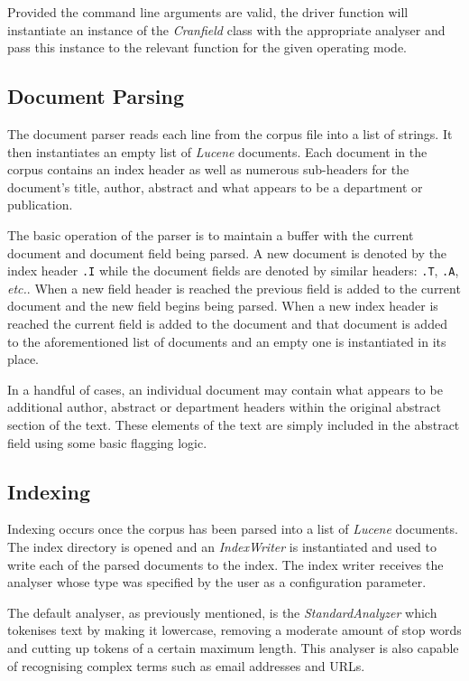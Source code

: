 \documentclass[journal]{IEEEtran}
\begin{document}
Provided the command line arguments are valid, the driver function will instantiate an instance of the \textit{Cranfield} class with the appropriate analyser and pass this instance to the relevant function for the given operating mode.

\subsection{Document Parsing}

The document parser reads each line from the corpus file into a list of strings. It then instantiates an empty list of \textit{Lucene} documents. Each document in the corpus contains an index header as well as numerous sub-headers for the document's title, author, abstract and what appears to be a department or publication.

The basic operation of the parser is to maintain a buffer with the current document and document field being parsed. A new document is denoted by the index header \texttt{.I} while the document fields are denoted by similar headers: \texttt{.T}, \texttt{.A}, \textit{etc.}. When a new field header is reached the previous field is added to the current document and the new field begins being parsed. When a new index header is reached the current field is added to the document and that document is added to the aforementioned list of documents and an empty one is instantiated in its place.

In a handful of cases, an individual document may contain what appears to be additional author, abstract or department headers within the original abstract section of the text. These elements of the text are simply included in the abstract field using some basic flagging logic.

\subsection{Indexing}

Indexing occurs once the corpus has been parsed into a list of \textit{Lucene} documents. The index directory is opened and an \textit{IndexWriter} is instantiated and used to write each of the parsed documents to the index. The index writer receives the analyser whose type was specified by the user as a configuration parameter.

The default analyser, as previously mentioned, is the \textit{StandardAnalyzer} which tokenises text by making it lowercase, removing a moderate amount of stop words and cutting up tokens of a certain maximum length. This analyser is also capable of recognising complex terms such as email addresses and URLs.
\end{document}
